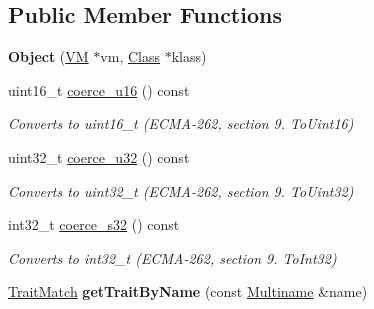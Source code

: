\subsection*{Public Member Functions}
\begin{DoxyCompactItemize}
\item 
\hypertarget{classjswf_1_1avm2_1_1_object_abb25a126cb469bfd01fbbf193175f365}{{\bfseries Object} (\hyperlink{classjswf_1_1avm2_1_1_v_m}{V\+M} $\ast$vm, \hyperlink{classjswf_1_1avm2_1_1_class}{Class} $\ast$klass)}\label{classjswf_1_1avm2_1_1_object_abb25a126cb469bfd01fbbf193175f365}

\item 
\hypertarget{classjswf_1_1avm2_1_1_object_a0bcf1f52a7f769165afa385bbe4af929}{uint16\+\_\+t \hyperlink{classjswf_1_1avm2_1_1_object_a0bcf1f52a7f769165afa385bbe4af929}{coerce\+\_\+u16} () const }\label{classjswf_1_1avm2_1_1_object_a0bcf1f52a7f769165afa385bbe4af929}

\begin{DoxyCompactList}\small\item\em Converts to {\ttfamily uint16\+\_\+t} (E\+C\+M\+A-\/262, section 9. {\itshape To\+Uint16}) \end{DoxyCompactList}\item 
\hypertarget{classjswf_1_1avm2_1_1_object_ad43d5df01cf90a380407c4b2e7e55347}{uint32\+\_\+t \hyperlink{classjswf_1_1avm2_1_1_object_ad43d5df01cf90a380407c4b2e7e55347}{coerce\+\_\+u32} () const }\label{classjswf_1_1avm2_1_1_object_ad43d5df01cf90a380407c4b2e7e55347}

\begin{DoxyCompactList}\small\item\em Converts to {\ttfamily uint32\+\_\+t} (E\+C\+M\+A-\/262, section 9. {\itshape To\+Uint32}) \end{DoxyCompactList}\item 
\hypertarget{classjswf_1_1avm2_1_1_object_a8964127c38a8062255a9c011fde3d00b}{int32\+\_\+t \hyperlink{classjswf_1_1avm2_1_1_object_a8964127c38a8062255a9c011fde3d00b}{coerce\+\_\+s32} () const }\label{classjswf_1_1avm2_1_1_object_a8964127c38a8062255a9c011fde3d00b}

\begin{DoxyCompactList}\small\item\em Converts to {\ttfamily int32\+\_\+t} (E\+C\+M\+A-\/262, section 9. {\itshape To\+Int32}) \end{DoxyCompactList}\item 
\hypertarget{classjswf_1_1avm2_1_1_object_a90d8bccb705b510a015a7a3976aedd71}{\hyperlink{structjswf_1_1avm2_1_1_trait_match}{Trait\+Match} {\bfseries get\+Trait\+By\+Name} (const \hyperlink{structjswf_1_1avm2_1_1_multiname}{Multiname} \&name)}\label{classjswf_1_1avm2_1_1_object_a90d8bccb705b510a015a7a3976aedd71}


\end{DoxyCompactItemize}
